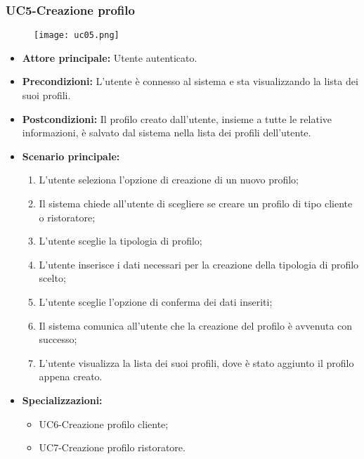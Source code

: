 \subsubsection{UC5-Creazione profilo}
\begin{figure}[h] \texttt{[image: uc05.png]} \end{figure}
\begin{itemize}
    \item \textbf{Attore principale:} Utente autenticato.
    \item \textbf{Precondizioni:} L'utente è connesso al sistema e sta visualizzando la lista dei suoi profili.
    \item \textbf{Postcondizioni:} Il profilo creato dall'utente, insieme a tutte le relative informazioni,
    è salvato dal sistema nella lista dei profili dell'utente.
    \item \textbf{Scenario principale:}
    \begin{enumerate}
        \item L'utente seleziona l'opzione di creazione di un nuovo profilo;
        \item Il sistema chiede all'utente di scegliere se creare un profilo di tipo cliente
        o ristoratore;
        \item L'utente sceglie la tipologia di profilo;
        \item L'utente inserisce i dati necessari per la creazione della tipologia di profilo scelto;
        \item L'utente sceglie l'opzione di conferma dei dati inseriti;
        \item Il sistema comunica all'utente che la creazione del profilo è avvenuta con successo;
        \item L'utente visualizza la lista dei suoi profili, dove è stato aggiunto il profilo appena creato.
    \end{enumerate}
    \item \textbf{Specializzazioni:}
        \begin{itemize}
            \item UC6-Creazione profilo cliente;
            \item UC7-Creazione profilo ristoratore.
        \end{itemize}
\end{itemize}

